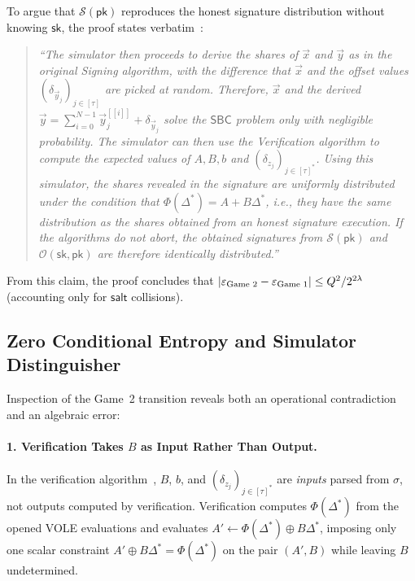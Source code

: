 \documentclass[11pt,a4paper]{article}
\theoremstyle{definition}
\theoremstyle{remark}
\newcommand{\SBC}{\mathsf{SBC}}
\newcommand{\pk}{\mathsf{pk}}
\newcommand{\sk}{\mathsf{sk}}
\newcommand{\salt}{\mathsf{salt}}
\newcommand{\share}[1]{[\![#1]\!]}
\begin{document}
To argue that $\mathcal{S}(\pk)$ reproduces the honest signature distribution without knowing $\sk$, the proof states verbatim~\cite[Appendix~A, p.~35, full version]{HJ25}:
\begin{quote}
\itshape
``The simulator then proceeds to derive the shares of $\vec{x}$ and $\vec{y}$ as in the original Signing algorithm, with the difference that $\vec{x}$ and the offset values $(\delta_{\vec{y}_j})_{j \in [\tau]}$ are picked at random. Therefore, $\vec{x}$ and the derived $\vec{y} = \sum_{i=0}^{N-1} \vec{y}_j^{\share{i}} + \delta_{\vec{y}_j}$ solve the $\SBC$ problem only with negligible probability. The simulator can then use the Verification algorithm to compute the expected values of $A, B, b$ and $(\delta_{z_j})_{j \in [\tau]^*}$. Using this simulator, the shares revealed in the signature are uniformly distributed under the condition that $\Phi(\Delta^*) = A + B\Delta^*$, i.e., they have the same distribution as the shares obtained from an honest signature execution. If the algorithms do not abort, the obtained signatures from $\mathcal{S}(\pk)$ and $\mathcal{O}(\sk, \pk)$ are therefore identically distributed.''
\end{quote}
From this claim, the proof concludes that $|\varepsilon_{\textup{Game 2}} - \varepsilon_{\textup{Game 1}}| \le Q^2 / 2^{2\lambda}$ (accounting only for $\salt$ collisions).

\subsection{Zero Conditional Entropy and Simulator Distinguisher}
Inspection of the Game~2 transition reveals both an operational contradiction and an algebraic error:

\paragraph{1. Verification Takes $B$ as Input Rather Than Output.}
In the verification algorithm~\cite[Section~5]{HJ25}, $B$, $b$, and $(\delta_{z_j})_{j \in [\tau]^*}$ are \emph{inputs} parsed from $\sigma$, not outputs computed by verification. Verification computes $\Phi(\Delta^*)$ from the opened VOLE evaluations and evaluates $A' \leftarrow \Phi(\Delta^*) \oplus B\Delta^*$, imposing only one scalar constraint $A' \oplus B\Delta^* = \Phi(\Delta^*)$ on the pair $(A', B)$ while leaving $B$ undetermined.
\end{document}
